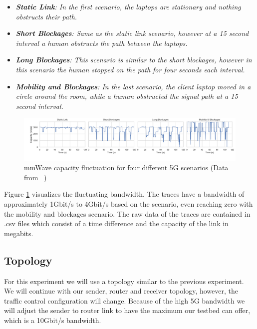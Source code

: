 \documentclass[a4paper,english, 11pt]{report}
\begin{document}
\begin{itemize}
  \item \textit{\textbf{Static Link}: In the first scenario, the laptops are stationary and nothing obstructs their path.}
  \item \textit{\textbf{Short Blockages}: Same as the static link scenario, however at a 15 second interval a human obstructs the path between the laptops.}
  \item \textit{\textbf{Long Blockages}: This scenario is similar to the short blockages, however in this scenario the human stopped on the path for four seconds each interval.}
  \item \textit{\textbf{Mobility and Blockages}: In the last scenario, the client laptop moved in a circle around the room, while a human obstructed the signal path at a 15 second interval.}
\end{itemize}



\begin{figure}[h!] %
	\centering
	\includegraphics[scale=0.33]{../diagrams/witestlab/mmwave_cap2.png}
  	\caption{mmWave capacity fluctuation for four different 5G scenarios (Data from ~\cite{Srivastava_Fund_Panwar_2020})}
  	\label{fig:witestlab_graph1}
\end{figure}

Figure \ref{fig:witestlab_graph1} visualizes the fluctuating bandwidth. The traces have a bandwidth of approximately 1Gbit/s to 4Gbit/s based on the scenario, even reaching zero with the mobility and blockages scenario. The raw data of the traces are contained in .csv files which consist of a time difference and the capacity of the link in megabits.


\subsection{Topology}
For this experiment we will use a topology similar to the previous experiment. We will continue with our sender, router and receiver topology, however, the traffic control configuration will change. Because of the high 5G bandwidth we will adjust the sender to router link to have the maximum our testbed can offer, which is a 10Gbit/s bandwidth.\\
\end{document}

